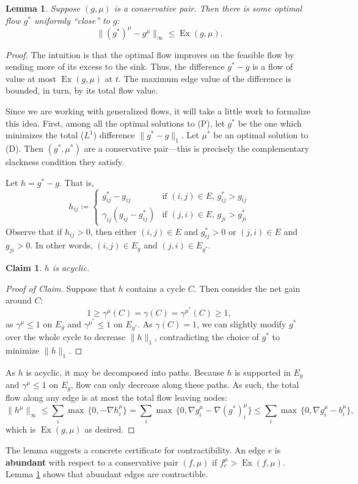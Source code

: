 \documentclass[11pt]{article}
\newtheorem{lemma}[theorem]{Lemma}
\newtheorem{claim}[theorem]{Claim}
\theoremstyle{definition}
\theoremstyle{definition}
\theoremstyle{definition}
\newcommand{\biu}{b_{i}^{\mu}}
\newcommand{\gij}{\gamma_{ij}}
\DeclareMathOperator{\Ex}{Ex}
\begin{document}
	\begin{lemma} \label{lem.bound-dist}
	Suppose $(g, \mu)$ is a conservative pair. Then there is some optimal flow $g^*$
    uniformly ``close'' to $g$:
    \[ \|(g^*)^\mu - g^\mu\|_\infty \leq \Ex(g, \mu). \]
    \end{lemma}
    \begin{proof}
    The intuition is that the optimal flow improves on the feasible flow by
    sending more of its excess to the sink. Thus, the difference $g^* - g$
    is a flow of value at most $\Ex(g, \mu)$ at $t$. The maximum edge value of
    the difference is bounded, in turn, by its total flow value.
    
	Since we are working with generalized flows, it will take a little work to formalize
	this idea. First, among all the optimal solutions to (P), let $g^*$ be the one
	which minimizes the total ($L^1$) difference $\|g^* - g\|_1$. Let $\mu^*$ be an
	optimal solution to (D). Then $(g^*, \mu^*)$ are a conservative pair---this is precisely
	the complementary slackness condition they satisfy.
	
	Let $h = g^* - g$. That is,
	\[ h_{ij} \coloneqq \begin{cases}
							g^*_{ij} - g_{ij} & \text{if } (i, j) \in E, \,
														   g^*_{ij} > g_{ij} \\
							\gij(g_{ij} - g^*_{ij}) & \text{if } (j, i) \in E, \,
																 g_{ji} > g^*_{ji}
						\end{cases} \]
    Observe that if $h_{ij} > 0$, then either $(i, j) \in E$ and $g^*_{ij} > 0$ or
    $(j, i) \in E$ and $g_{ji} > 0$. In other words,
    $(i, j) \in E_g$ and $(j, i) \in E_{g^*}$.
    
    \begin{claim} \label{claim:nocycles} $h$ is acyclic. \end{claim}
    \begin{proof}[Proof of Claim]
    Suppose that $h$ contains a cycle $C$. Then consider the net gain around $C$:
    \[ 1 \geq \gamma^\mu(C) = \gamma(C) = \gamma^{\mu^*}(C) \geq 1, \]
    as $\gamma^\mu \leq 1$ on $E_g$ and $\gamma^{\mu^*} \leq 1$ on $E_{g^*}$.
    As $\gamma(C) = 1$, we can slightly modify $g^*$ over the whole cycle to
    decrease $\|h\|_1$, contradicting the choice of $g^*$ to minimize $\|h\|_1$.
    \end{proof}
    
    As $h$ is acyclic, it may be decomposed into paths.
    Because $h$ is supported in $E_g$ and
    $\gamma^\mu \leq 1$ on $E_g$, flow can only decrease along these paths.
    As such, the total flow along any edge is at most the total flow leaving nodes:
    \[ \|h^\mu\|_\infty \leq \sum_i \max\,\{0, -\nabla h_i^\mu\}
     = \sum_i \max\,\{0, \nabla g_i^\mu - \nabla (g^*)_i^\mu\}
     \leq \sum_i \max\,\{0, \nabla g_i^\mu - \biu \}, \]
     which is $\Ex(g, \mu)$ as desired.
    \end{proof}
    The lemma suggests a concrete certificate for contractibility. An edge $e$ is
    \textbf{abundant} with respect to a conservative pair $(f, \mu)$
    if $f^\mu_e > \Ex(f, \mu)$.
    Lemma \ref{lem.bound-dist} shows that abundant edges are contractible.
    
\end{document}
